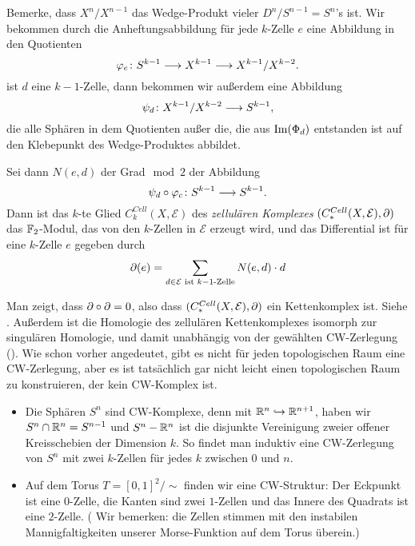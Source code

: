 \begin{definition}
    \label{def: zellulaerer kettenkomplex}
    Bemerke, dass $X^n / X^{n - 1}$ das Wedge-Produkt vieler $D^n / S^{n-1} = S^n$'s ist. 
    Wir bekommen durch die Anheftungsabbildung für jede $k$-Zelle $e$ eine Abbildung in den 
    Quotienten
    \[ \varphi_e \colon S^{k-1} \longrightarrow X^{k - 1} \longrightarrow X^{k - 1} / X^{k - 2} . \]
    ist $d$ eine $k - 1$-Zelle, dann bekommen wir außerdem eine Abbildung 
    \[ \psi_d \colon X^{k - 1} / X^{k - 2} \longrightarrow S^{k - 1} , \]
    die alle Sphären in dem Quotienten außer die, die aus ${ \operatorname{Im} } (\Phi_d)$ entstanden ist
    auf den Klebepunkt des Wedge-Produktes abbildet.

    Sei dann $N(e, d)$ der Grad$\mod 2$ der Abbildung
    \[ \psi_d \circ \varphi_c \colon S^{k - 1} \longrightarrow S^{k - 1} . \]
    Dann ist das $k$-te Glied $C^{Cell}_k(X, \mathcal{E})$ des \textit{zellulären Komplexes} 
    $(C^{Cell}_{\ast}(X, \mathcal{E}), { \partial })$ das 
    ${ \mathbb F }_2$-Modul, das von den $k$-Zellen in $\mathcal{E}$ erzeugt wird, und das Differential ist für 
    eine $k$-Zelle $e$ gegeben durch
    \[ { \partial } (e) = \sum_{d \in \mathcal{E} \text{ ist } k-1\text{-Zelle}} N(e, d) \cdot d \] 
\end{definition}

\begin{remark}
    Man zeigt, dass ${ \partial } \circ { \partial } = 0$, also dass $(C^{Cell}_{\ast}(X, \mathcal{E}), { \partial })$ 
    ein Kettenkomplex ist. Siehe \cite{dold}. Außerdem ist die Homologie des zellulären 
    Kettenkomplexes isomorph zur singulären Homologie, und damit unabhängig von der gewählten 
    CW-Zerlegung (\cite{hatcher}). Wie schon vorher angedeutet, gibt es nicht für jeden 
    topologischen Raum eine CW-Zerlegung, aber es ist tatsächlich gar nicht leicht einen 
    topologischen Raum zu konstruieren, der kein CW-Komplex ist.
\end{remark}

\begin{example}
    \begin{itemize}
        \item Die Sphären $S^n$ sind CW-Komplexe, denn mit ${ \mathbb R }^n \hookrightarrow { \mathbb R }^{n + 1}$,
            haben wir $S^n \cap { \mathbb R }^n = S^{n - 1}$ und $S^n - { \mathbb R }^n$ ist die disjunkte Vereinigung
            zweier offener Kreisschebien der Dimension $k$. So findet man induktiv eine CW-Zerlegung
            von $S^n$ mit zwei $k$-Zellen für jedes $k$ zwischen $0$ und $n$.
        \item Auf dem Torus $T = [0, 1]^2 / \sim$ finden wir eine CW-Struktur:
            Der Eckpunkt ist eine $0$-Zelle, die Kanten sind zwei $1$-Zellen und das Innere des 
            Quadrats ist eine $2$-Zelle.
            ( Wir bemerken: die Zellen stimmen mit den instabilen Mannigfaltigkeiten unserer 
             Morse-Funktion auf dem Torus überein.)
    \end{itemize}
\end{example}

